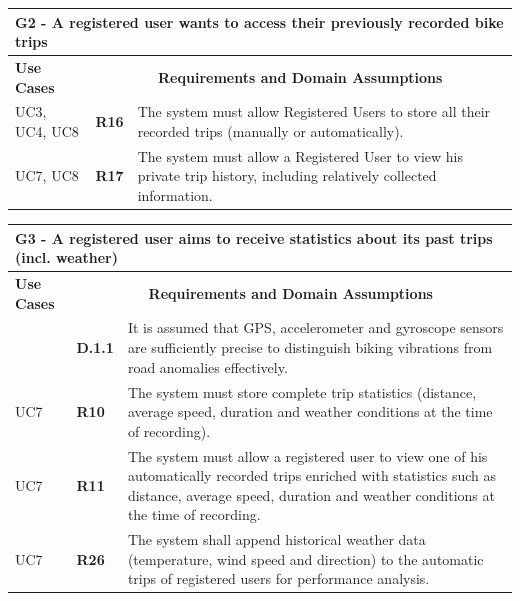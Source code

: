 \vspace{0.5cm}

\begin{longtable}{|p{2.5cm}|p{1cm}|p{10.5cm}|}
\hline
\multicolumn{3}{|p{14.5cm}|}{\centering \textbf{G2 - A registered user wants to access their previously recorded bike trips}} \\
\hline
\textbf{Use Cases} & \multicolumn{2}{c|}{\textbf{Requirements and Domain Assumptions}} \\
\hline
UC3, UC4, UC8 & \textbf{R16} & The system must allow Registered Users to store all their recorded trips (manually or automatically). \\
\hline
UC7, UC8 & \textbf{R17} & The system must allow a Registered User to view his private trip history, including relatively collected information. \\
\hline
\end{longtable}

\vspace{0.5cm}

\begin{longtable}{|p{2.5cm}|p{1cm}|p{10.5cm}|}
\hline
\multicolumn{3}{|p{14.5cm}|}{\centering \textbf{G3 - A registered user aims to receive statistics about its past trips (incl. weather)}} \\
\hline
\textbf{Use Cases} & \multicolumn{2}{c|}{\textbf{Requirements and Domain Assumptions}} \\
\hline
& \textbf{D.1.1} & It is assumed that GPS, accelerometer and gyroscope sensors are sufficiently precise to distinguish biking vibrations from road anomalies effectively. \\
\hline
UC7 & \textbf{R10} & The system must store complete trip statistics (distance, average speed, duration and weather conditions at the time of recording). \\
\hline
UC7 & \textbf{R11} & The system must allow a registered user to view one of his automatically recorded trips enriched with statistics such as distance, average speed, duration and weather conditions at the time of recording. \\
\hline
UC7 & \textbf{R26} & The system shall append historical weather data (temperature, wind speed and direction) to the automatic trips of registered users for performance analysis. \\
\hline
\end{longtable}

\newpage

